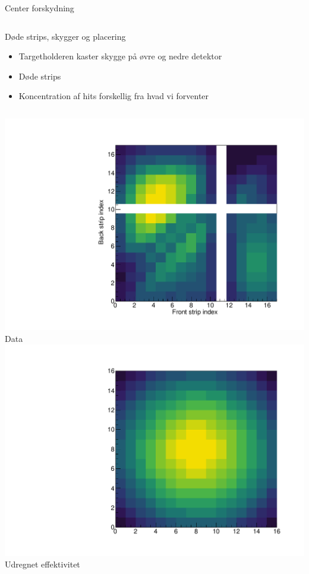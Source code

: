 \begin{frame}{Center forskydning}
\begin{columns}
\end{columns}
\end{frame}

\begin{frame}{Døde strips, skygger og placering}
	\begin{itemize}
		\item Targetholderen kaster skygge på øvre og nedre detektor
		\item Døde strips 
		\item Koncentration af hits forskellig fra hvad vi forventer
	\end{itemize}
	\begin{columns}
		\centering
		\includegraphics[width=\columnwidth]{../figures/mexihatDet4.pdf}
		\tiny Data
		\centering
		\includegraphics[width=\columnwidth]{../figures/mexihatDet4Theory.pdf}
		\tiny Udregnet effektivitet
	\end{columns}
\end{frame}